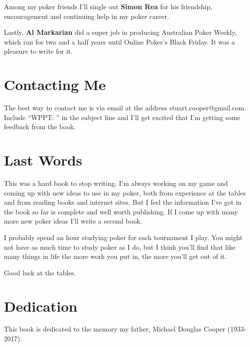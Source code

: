 Among my poker friends I'll single out \textbf{Simon Rea} for his friendship,
encouragement and continuing help in my poker career.

Lastly, \textbf{Al Markarian} did a super job in producing Australian
Poker Weekly, which ran for two and a half years until Online Poker's
Black Friday. It was a pleasure to write for it.

\section*{Contacting Me}

The best way to contact me is via email at the address
stuart.cooper@gmail.com. Include ``WPPT: '' in the subject
line and I'll get excited that I'm getting some feedback from
the book.

\section*{Last Words}

This was a hard book to stop writing. I'm always working on my game
and coming up with new ideas to use in my poker, both from experience
at the tables and from reading books and internet sites. But I feel the
information I've got in the book so far is complete and well worth
publishing. If I come up with many more new poker ideas I'll write
a second book.

I probably spend an hour studying poker for each tournament I play.
You might not have as much time to study poker as I do, but I think you'll
find that like many things in life the more work you put in, the
more you'll get out of it.

Good luck at the tables.

\section*{Dedication}

This book is dedicated to the memory my father,
Michael Douglas Cooper (1933-2017).





